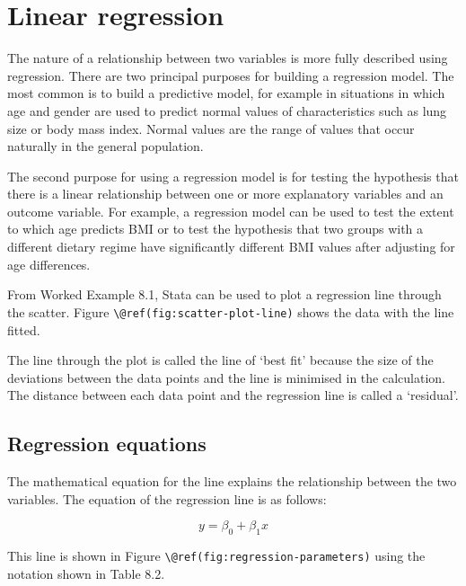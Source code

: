 \documentclass[
]{memoir}
\begin{document}
\hypertarget{linear-regression}{%
\section{Linear regression}\label{linear-regression}}

The nature of a relationship between two variables is more fully described using regression. There are two principal purposes for building a regression model. The most common is to build a predictive model, for example in situations in which age and gender are used to predict normal values of characteristics such as lung size or body mass index. Normal values are the range of values that occur naturally in the general population.

The second purpose for using a regression model is for testing the hypothesis that there is a linear relationship between one or more explanatory variables and an outcome variable. For example, a regression model can be used to test the extent to which age predicts BMI or to test the hypothesis that two groups with a different dietary regime have significantly different BMI values after adjusting for age differences.

From Worked Example 8.1, Stata can be used to plot a regression line through the scatter. Figure \texttt{\textbackslash{}@ref(fig:scatter-plot-line)} shows the data with the line fitted.

The line through the plot is called the line of `best fit' because the size of the deviations between the data points and the line is minimised in the calculation. The distance between each data point and the regression line is called a `residual'.

\hypertarget{regression-equations}{%
\subsection{Regression equations}\label{regression-equations}}

The mathematical equation for the line explains the relationship between the two variables. The equation of the regression line is as follows:

\[y = \beta_{0} + \beta_{1}x\]

This line is shown in Figure \texttt{\textbackslash{}@ref(fig:regression-parameters)} using the notation shown in Table 8.2.

 
  \providecommand{\huxb}[2]{\arrayrulecolor[RGB]{#1}\global\arrayrulewidth=#2pt}
  \providecommand{\huxvb}[2]{\color[RGB]{#1}\vrule width #2pt}
  \providecommand{\huxtpad}[1]{\rule{0pt}{#1}}
  \providecommand{\huxbpad}[1]{\rule[-#1]{0pt}{#1}}
\end{document}
